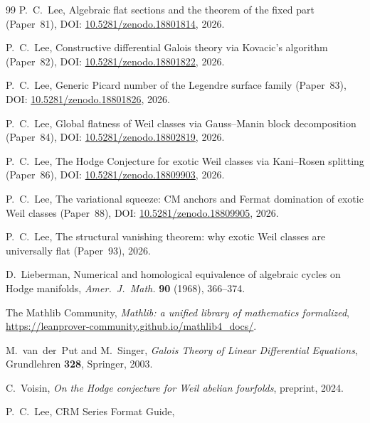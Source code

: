\documentclass[11pt]{article}
\theoremstyle{plain}
\theoremstyle{definition}
\theoremstyle{remark}
\begin{document}
\begin{thebibliography}{99}
P.~C.~Lee,
Algebraic flat sections and the theorem of the fixed part (Paper~81),
DOI: \href{https://doi.org/10.5281/zenodo.18801814}{10.5281/zenodo.18801814}, 2026.

P.~C.~Lee,
Constructive differential Galois theory via Kovacic's algorithm (Paper~82),
DOI: \href{https://doi.org/10.5281/zenodo.18801822}{10.5281/zenodo.18801822}, 2026.

P.~C.~Lee,
Generic Picard number of the Legendre surface family (Paper~83),
DOI: \href{https://doi.org/10.5281/zenodo.18801826}{10.5281/zenodo.18801826}, 2026.

P.~C.~Lee,
Global flatness of Weil classes via Gauss--Manin block decomposition
(Paper~84),
DOI: \href{https://doi.org/10.5281/zenodo.18802819}{10.5281/zenodo.18802819}, 2026.

P.~C.~Lee,
The Hodge Conjecture for exotic Weil classes via Kani--Rosen splitting
(Paper~86),
DOI: \href{https://doi.org/10.5281/zenodo.18809903}{10.5281/zenodo.18809903}, 2026.

P.~C.~Lee,
The variational squeeze: CM anchors and Fermat domination of exotic
Weil classes (Paper~88),
DOI: \href{https://doi.org/10.5281/zenodo.18809905}{10.5281/zenodo.18809905}, 2026.

P.~C.~Lee,
The structural vanishing theorem: why exotic Weil classes are
universally flat (Paper~93),
2026.

D.~Lieberman,
Numerical and homological equivalence of algebraic cycles on Hodge manifolds,
\emph{Amer.\ J.\ Math.} \textbf{90} (1968), 366--374.

The Mathlib Community,
\emph{Mathlib: a unified library of mathematics formalized},
\url{https://leanprover-community.github.io/mathlib4_docs/}.

M.~van~der~Put and M.~Singer,
\emph{Galois Theory of Linear Differential Equations},
Grundlehren \textbf{328}, Springer, 2003.

C.~Voisin,
\emph{On the Hodge conjecture for Weil abelian fourfolds},
preprint, 2024.

P.~C.~Lee,
CRM Series Format Guide,

\end{thebibliography}
\end{document}
